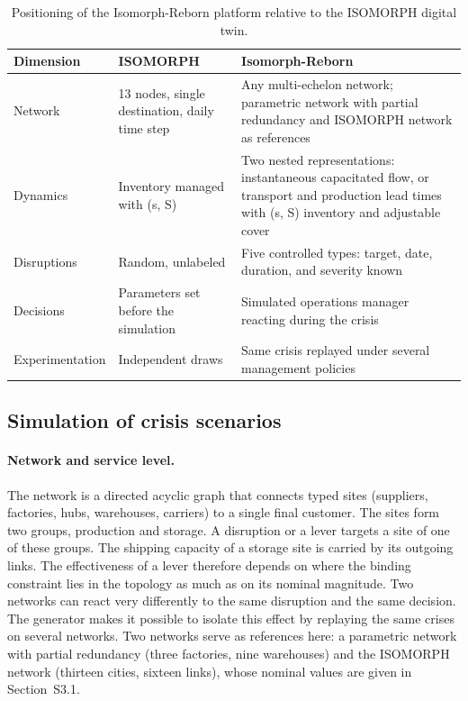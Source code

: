 \begin{table}[htbp]
\caption{Positioning of the Isomorph-Reborn platform relative to the ISOMORPH digital twin.}
\label{tab:isomorph}
\footnotesize
\begin{tabularx}{\textwidth}{@{}P{2.3cm}P{3cm}L@{}}
\toprule
\textbf{Dimension} & \textbf{ISOMORPH} & \textbf{Isomorph-Reborn} \\
\toprule
Network & 13 nodes, single destination, daily time step & Any multi-echelon network; parametric network with partial redundancy and ISOMORPH network as references \\
\midrule
Dynamics & Inventory managed with (s, S) & Two nested representations: instantaneous capacitated flow, or transport and production lead times with (s, S) inventory and adjustable cover \\
\midrule
Disruptions & Random, unlabeled & Five controlled types: target, date, duration, and severity known \\
\midrule
Decisions & Parameters set before the simulation & Simulated operations manager reacting during the crisis \\
\midrule
Experimentation & Independent draws & Same crisis replayed under several management policies \\
\bottomrule
\end{tabularx}
\end{table}

\subsection{Simulation of crisis scenarios}
\label{sec:3.2}

\paragraph{Network and service level.} The network is a directed acyclic graph that connects typed sites (suppliers, factories, hubs, warehouses, carriers) to a single final customer. The sites form two groups, production and storage. A disruption or a lever targets a site of one of these groups. The shipping capacity of a storage site is carried by its outgoing links. The effectiveness of a lever therefore depends on where the binding constraint lies in the topology as much as on its nominal magnitude. Two networks can react very differently to the same disruption and the same decision. The generator makes it possible to isolate this effect by replaying the same crises on several networks. Two networks serve as references here: a parametric network with partial redundancy (three factories, nine warehouses) and the ISOMORPH network (thirteen cities, sixteen links), whose nominal values are given in Section~S3.1.

